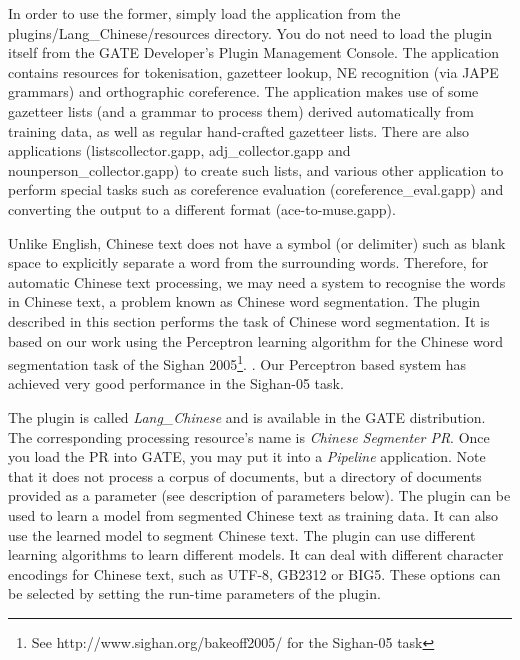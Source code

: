 In order to use the former, simply load the application from the\linebreak 
plugins/Lang\_Chinese/resources directory. You do not need to load the plugin 
itself from the GATE Developer's Plugin
Management Console. The application contains resources 
for tokenisation, gazetteer lookup, NE recognition (via JAPE grammars) and 
orthographic coreference. The application makes use of some gazetteer lists (and
a grammar to process them) derived automatically from training data, as well as 
regular hand-crafted gazetteer lists. There are also applications
(listscollector.gapp, adj\_collector.gapp and
nounperson\_collector.gapp) to create such lists, and various other
application to perform special tasks such as coreference evaluation
(coreference\_eval.gapp) and converting the output to a different
format (ace-to-muse.gapp).



Unlike English, Chinese text does not have a symbol (or delimiter)
 such as blank space to explicitly separate a word from the
 surrounding words.  Therefore, for automatic Chinese text processing,
 we may need a system to recognise the words in Chinese text, a
 problem known as Chinese word segmentation. The plugin described in
 this section performs the task of Chinese word segmentation. It is
 based on our work using the Perceptron learning algorithm for the Chinese
 word segmentation task of the Sighan 2005\footnote{See
 http://www.sighan.org/bakeoff2005/ for the Sighan-05 task}.
\cite{Yaoyong05b}. Our Perceptron based system has achieved very good
performance in the Sighan-05 task.

The plugin is called {\em Lang\_Chinese} and is available in the GATE
distribution. The corresponding processing resource's name is {\em Chinese
  Segmenter PR}. Once you load the PR into GATE, you may put it into a {\em
  Pipeline} application. Note that it does not process a corpus of documents,
but a directory of documents provided as a parameter (see description of
parameters below). The plugin can be used to learn a model from segmented
Chinese text as training data. It can also use the learned model to segment
Chinese text.  The plugin can use different learning algorithms to learn
different models.  It can deal with different character encodings for
Chinese text, such as UTF-8, GB2312 or BIG5.  These options can
be selected by setting the run-time parameters of the plugin.

